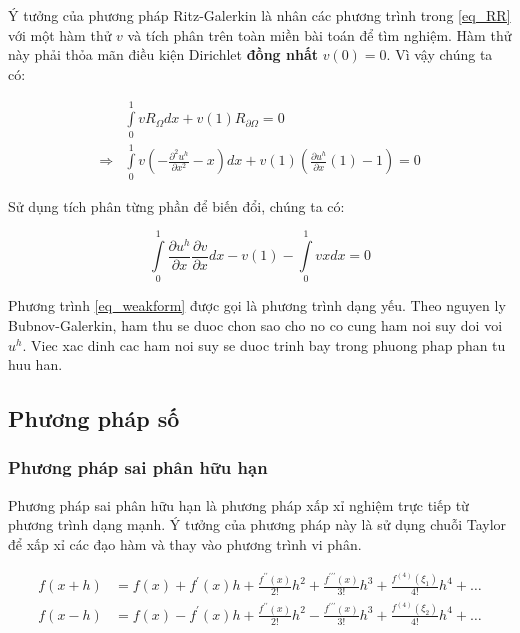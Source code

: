 Ý tưởng của phương pháp Ritz-Galerkin là nhân các phương trình trong \cref{eq_RR} với một hàm thử $v$ và tích phân trên toàn miền bài toán để tìm nghiệm. Hàm thử này phải thỏa mãn điều kiện Dirichlet \textbf{đồng nhất} $v(0) = 0$. Vì vậy chúng ta có:

\begin{equation}\label{eq_Ritz}
    \begin{aligned}
        &\int\limits_0^1 v R_{\Omega}dx + v(1)R_{\partial\Omega} = 0 \\
        \Rightarrow &\int\limits_0^1 v \left(-\frac{\partial^2 u^h}{\partial x^2} - x\right)dx + v(1)\left(\frac{\partial u^h}{\partial x} \left(1\right) - 1\right) =0
    \end{aligned}
\end{equation}

Sử dụng tích phân từng phần để biến đổi, chúng ta có:

\begin{equation}\label{eq_weakform}
    \int\limits_0^1 \frac{\partial u^h}{\partial x} \frac{\partial v}{\partial x}dx - v(1) - \int\limits_0^1 v x dx =0
\end{equation}

Phương trình \cref{eq_weakform} được gọi là phương trình dạng yếu. Theo nguyen ly Bubnov-Galerkin, ham thu se duoc chon sao cho no co cung ham noi suy doi voi $u^h$. Viec xac dinh cac ham noi suy se duoc trinh bay trong phuong phap phan tu huu han.

\subsection{Phương pháp số}

\subsubsection{Phương pháp sai phân hữu hạn}

Phương pháp sai phân hữu hạn là phương pháp xấp xỉ nghiệm trực tiếp từ phương trình dạng mạnh. Ý tưởng của phương pháp này là sử dụng chuỗi Taylor để xấp xỉ các đạo hàm và thay vào phương trình vi phân.

\begin{equation}\label{eq_taylor}
    \begin{aligned}
        f(x+h) &=f(x)+f^{\prime}(x) h+\frac{f^{\prime \prime}(x)}{2!} h^2+\frac{f^{\prime \prime \prime}(x)}{3!} h^3+\frac{f^{(4)}\left(\xi_1\right)}{4!} h^4 + \dots\\
        f(x-h) &=f(x)-f^{\prime}(x) h+\frac{f^{\prime \prime}(x)}{2!} h^2-\frac{f^{\prime \prime \prime}(x)}{3!} h^3+\frac{f^{(4)}\left(\xi_2\right)}{4!} h^4 + \dots
\end{aligned}
\end{equation}

